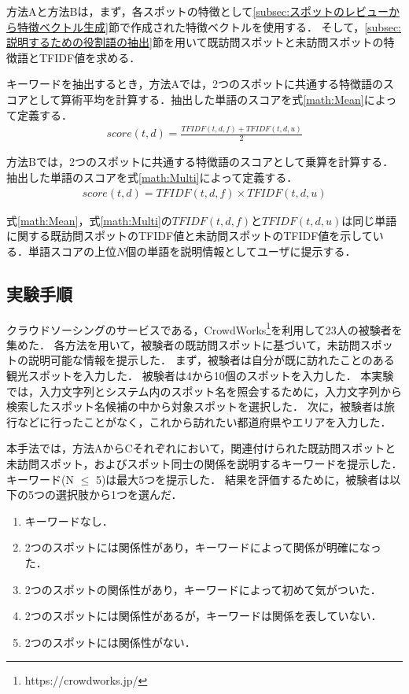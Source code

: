 \documentclass[submit,techrep,noauthor]{ipsj}
\begin{document}
方法Aと方法Bは，まず，各スポットの特徴として\ref{subsec:スポットのレビューから特徴ベクトル生成}節で作成された特徴ベクトルを使用する．
そして，\ref{subsec:説明するための役割語の抽出}節を用いて既訪問スポットと未訪問スポットの特徴語とTFIDF値を求める．

キーワードを抽出するとき，方法Aでは，2つのスポットに共通する特徴語のスコアとして算術平均を計算する．抽出した単語のスコアを式\ref{math:Mean}によって定義する．
\begin{eqnarray}
  score(t,d) = \frac{TFIDF(t,d,f) + TFIDF(t,d,u)}{2}
  \label{math:Mean}
\end{eqnarray}

方法Bでは，2つのスポットに共通する特徴語のスコアとして乗算を計算する．抽出した単語のスコアを式\ref{math:Multi}によって定義する．
\begin{eqnarray}
  score(t,d) = TFIDF(t,d,f) \times TFIDF(t,d,u)
  \label{math:Multi}
\end{eqnarray}

式\ref{math:Mean}，式\ref{math:Multi}の$TFIDF(t,d,f)$と$TFIDF(t,d,u)$は同じ単語に関する既訪問スポットのTFIDF値と未訪問スポットのTFIDF値を示している．単語スコアの上位$N$個の単語を説明情報としてユーザに提示する．

\subsection{実験手順}
\label{subsec:実験手順}
クラウドソーシングのサービスである，CrowdWorks\footnote{https://crowdworks.jp/}を利用して23人の被験者を集めた．
各方法を用いて，被験者の既訪問スポットに基づいて，未訪問スポットの説明可能な情報を提示した．
まず，被験者は自分が既に訪れたことのある観光スポットを入力した．
被験者は4から10個のスポットを入力した．
本実験では，入力文字列とシステム内のスポット名を照会するために，入力文字列から検索したスポット名候補の中から対象スポットを選択した．
次に，被験者は旅行などに行ったことがなく，これから訪れたい都道府県やエリアを入力した．

本手法では，方法AからCそれぞれにおいて，関連付けられた既訪問スポットと未訪問スポット，およびスポット同士の関係を説明するキーワードを提示した．
キーワード(N $\le$ 5)は最大5つを提示した．
結果を評価するために，被験者は以下の5つの選択肢から1つを選んだ．
\begin{enumerate}
  \item キーワードなし．
  \item 2つのスポットには関係性があり，キーワードによって関係が明確になった．
  \item 2つのスポットの関係性があり，キーワードによって初めて気がついた．
  \item 2つのスポットには関係性があるが，キーワードは関係を表していない．
  \item 2つのスポットには関係性がない．
\end{enumerate}
\end{document}
